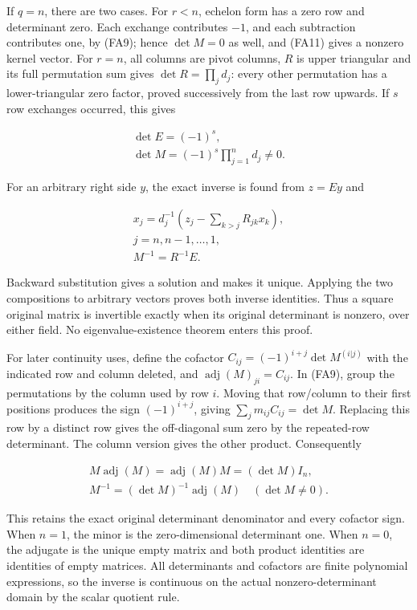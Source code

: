 \documentclass[
  11pt,
]{article}
\begin{document}
If \(q=n\), there are two cases. For \(r<n\), echelon form has a zero
row and determinant zero. Each exchange contributes \(-1\), and each
subtraction contributes one, by (FA9); hence \(\det M=0\) as well, and
(FA11) gives a nonzero kernel vector. For \(r=n\), all columns are pivot
columns, \(R\) is upper triangular and its full permutation sum gives
\(\det R=\prod_j d_j\): every other permutation has a lower-triangular
zero factor, proved successively from the last row upwards. If \(s\) row
exchanges occurred, this gives

\[
\begin{gathered}
\det E=(-1)^s, \\ \det M=(-1)^s\prod_{j=1}^n d_j\ne0.
\end{gathered}
\tag{FA12}
\]

For an arbitrary right side \(y\), the exact inverse is found from
\(z=Ey\) and

\[
\begin{gathered}
x_j=d_j^{-1}\left(z_j-\sum_{k>j}R_{jk}x_k\right), \\  j=n,n-1,\ldots,1, \\ M^{-1}=R^{-1}E.
\end{gathered}
\tag{FA13}
\]

Backward substitution gives a solution and makes it unique. Applying the
two compositions to arbitrary vectors proves both inverse identities.
Thus a square original matrix is invertible exactly when its original
determinant is nonzero, over either field. No eigenvalue-existence
theorem enters this proof.

For later continuity uses, define the cofactor
\(C_{ij}=(-1)^{i+j}\det M^{(i|j)}\) with the indicated row and column
deleted, and \(\operatorname{adj}(M)_{ji}=C_{ij}\). In (FA9), group the
permutations by the column used by row \(i\). Moving that row/column to
their first positions produces the sign \((-1)^{i+j}\), giving
\(\sum_j m_{ij}C_{ij}=\det M\). Replacing this row by a distinct row
gives the off-diagonal sum zero by the repeated-row determinant. The
column version gives the other product. Consequently

\[
\begin{gathered}
M\operatorname{adj}(M)=\operatorname{adj}(M)M=(\det M)I_n, \\ M^{-1}=(\det M)^{-1}\operatorname{adj}(M)
\quad(\det M\ne0).
\end{gathered}
\tag{FA14}
\]

This retains the exact original determinant denominator and every
cofactor sign. When \(n=1\), the minor is the zero-dimensional
determinant one. When \(n=0\), the adjugate is the unique empty matrix
and both product identities are identities of empty matrices. All
determinants and cofactors are finite polynomial expressions, so the
inverse is continuous on the actual nonzero-determinant domain by the
scalar quotient rule.
\end{document}
